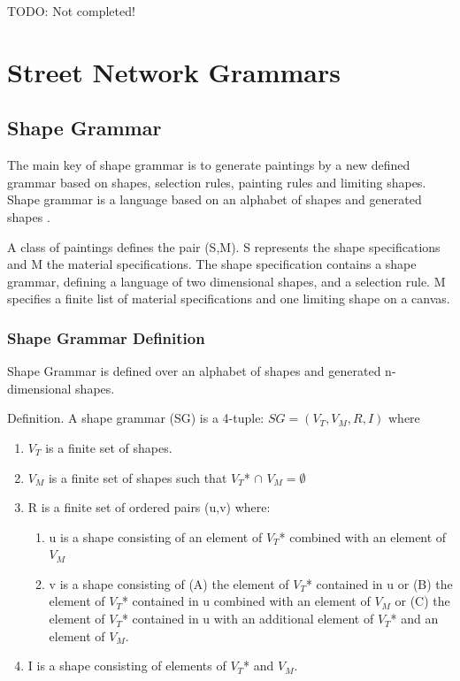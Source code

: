 \documentclass[11pt, a4paper]{report}
\begin{document}
TODO: Not completed!
\chapter{Street Network Grammars}
\section{Shape Grammar}
The main key of shape grammar is to generate paintings by a new defined grammar based on shapes, selection rules, painting rules and limiting shapes. Shape grammar is a language based on an alphabet of shapes and generated shapes \citep{shapeGrammars:1972}. 

A class of paintings defines the pair (S,M). S represents the shape specifications and M the material specifications. The shape specification contains a shape grammar, defining a language of two dimensional shapes, and a selection rule. M specifies a finite list of material specifications and one limiting shape on a canvas.

\subsection{Shape Grammar Definition}
\label{sec:Shape_Grammar_Definition}
Shape Grammar is defined over an alphabet of shapes and generated n-dimensional shapes\citep{shapeGrammars:1972}.
\begin{displayquote} 
    Definition. A shape grammar (SG) is a 4-tuple: $SG = (V_T, V_M, R, I)$ where
    \begin{enumerate}
        \item $V_T$ is a finite set of shapes.
        \item $V_M$ is a finite set of shapes such that $V_T $* $\cap$  $V_M = \emptyset$
        \item R is a finite set of ordered pairs (u,v) where:
        \begin{enumerate}
         \item u is a shape consisting of an element of $V_T $* combined with an element of $V_M$ \item v is a shape consisting of (A) the element of $V_T $* contained in u or (B) the element of $V_T $* contained in u combined with an element of $V_M$ or (C) the element of $V_T $* contained in u with an additional element of $V_T$* and an element of $V_M$.
        \end{enumerate}
        \item I is a shape consisting of elements of $V_T $* and $V_M$.
    \end{enumerate}
\end{displayquote}
\end{document}

